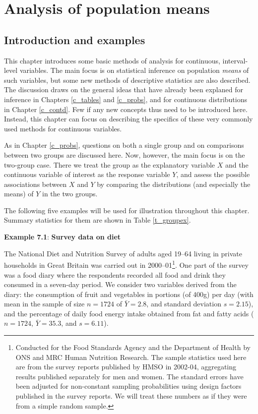 \chapter{Analysis of population means}
\label{c_means}

\section{Introduction and examples}
\label{s_means_intro}

This chapter introduces some basic methods of analysis for continuous,
interval-level variables. The main focus is on statistical inference on
population \emph{means} of such variables, but
some new methods of descriptive statistics are also described. The
discussion draws on the general ideas that have already been explaned
for inference in Chapters \ref{c_tables} and \ref{c_probs}, and for
continuous distributions in Chapter \ref{c_contd}. Few if any new
concepts thus need to be introduced here. Instead, this chapter can
focus on describing the specifics of these very commonly used methods
for continuous variables.

As in Chapter \ref{c_probs}, questions on both a single group and on
comparisons between two groups are discussed here. Now, however, the
main focus is on the two-group case. There we treat the group as the
explanatory variable $X$ and the continuous variable of interest as the
response variable $Y$, and assess the possible associations between $X$
and $Y$ by comparing the distributions (and especially the means) of $Y$
in the two groups.

The following five examples will be used for illustration throughout
this chapter. Summary statistics for them are
shown in Table \ref{t_groupex}.

\textbf{Example 7.1}: \textbf{Survey data on diet}

The National Diet and Nutrition Survey of adults aged 19--64
living in private households in Great Britain was carried out in
2000--01\footnote{Conducted for the Food
Standards Agency and the Department of Health by ONS and MRC Human
Nutrition Research. The sample statistics used here
are from the survey reports
published by HMSO in 2002-04, aggregating results published
separately for men and women.
The standard errors have been
adjusted for non-constant sampling probabilities using
design factors published in the survey reports. We will
treat these numbers as if they were from a simple random sample.}.
One part of the survey
was a food diary where the respondents recorded all food and
drink they consumed in a seven-day period. We consider two
variables derived from the diary: the
consumption of fruit and vegetables in portions (of 400g) per day
(with mean in the sample of size $n=1724$ of
$\bar{Y}=2.8$, and standard deviation $s=2.15$), and
the percentage of daily food energy intake obtained from fat
and fatty acids ($n=1724$, $\bar{Y}=35.3$, and
$s=6.11$).

